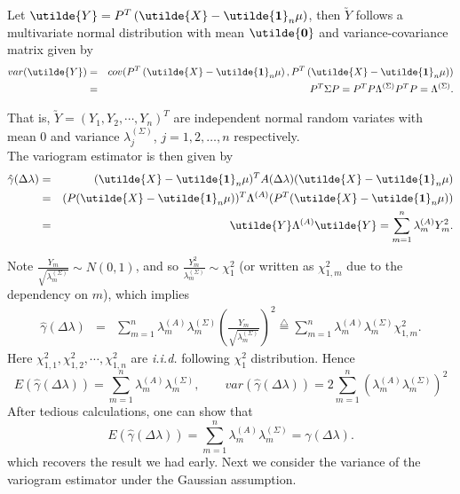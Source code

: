 Let $\utilde{Y} = P^T\left(\utilde{X} - \utilde{\bf 1}_n \mu \right)$, then $\utilde{Y}$ follows a multivariate normal distribution with mean $\utilde{\bf 0}$ and variance-covariance matrix given by
\begin{eqnarray*}
var(\utilde{Y}) &=& cov(P^T\left(\utilde{X} - \utilde{\bf 1}_n \mu \right), P^T\left(\utilde{X} - \utilde{\bf 1}_n \mu \right)) \\
&=& P^T \Sigma P  = P^T P \Lambda^{(\Sigma)} P^T P = \Lambda^{(\Sigma)}.
\end{eqnarray*}

That is, $\utilde{Y} = (Y_1, Y_2, \cdots, Y_n)^T$ are independent normal random variates with mean 0 and variance $\lambda_j^{(\Sigma)}$, $j=1,2,\ldots,n$ respectively. \\

The variogram estimator is then given by
\begin{eqnarray*}
\hat{\gamma}(\Delta \lambda) &=& (\utilde{X}-\utilde{\bf 1}_n\mu)^T A(\Delta \lambda)(\utilde{X}-\utilde{\bf 1}_n\mu) \\
&=& (P(\utilde{X}-\utilde{\bf 1}_n\mu))^T \Lambda^{(A)} (P^T(\utilde{X}-\utilde{\bf 1}_n\mu))  \\
&=& \utilde{Y} \Lambda^{(A)} \utilde{Y} = \sum_{m = 1}^n \lambda_m^{(A)} Y_m^2.
\end{eqnarray*}

Note $\frac{Y_m}{\sqrt{\lambda_m^{(\Sigma)}}} \sim N(0, 1)$, and so $\frac{Y_m^2}{\lambda_m^{(\Sigma)}} \sim \chi_1^2$ (or written as $\chi_{1, m}^2$ due to the dependency on $m$), which implies
\begin{eqnarray*}
\hat{\gamma}(\Delta \lambda) &=& \sum_{m = 1}^n \lambda_m^{(A)} \lambda_m^{(\Sigma)} \left(\frac{Y_m}{\sqrt{\lambda_m^{(\Sigma)}}}\right)^2 \stackrel{\triangle}{=} \sum_{m = 1}^n \lambda_m^{(A)} \lambda_m^{(\Sigma)} \chi_{1,m}^2.
\end{eqnarray*}
Here $\chi_{1, 1}^2, \chi_{1, 2}^2, \cdots, \chi_{1, n}^2$ are {\em i.i.d.} following $\chi_1^2$ distribution. Hence
\[
E(\hat{\gamma}(\Delta \lambda)) = \sum_{m = 1}^n \lambda_m^{(A)} \lambda_m^{(\Sigma)}, \quad \quad var(\hat{\gamma}(\Delta \lambda)) = 2 \sum_{m = 1}^n (\lambda_m^{(A)} \lambda_m^{(\Sigma)})^2
\]
After tedious calculations, one can show that
\[
E(\hat{\gamma}(\Delta \lambda)) = \sum_{m = 1}^n \lambda_m^{(A)} \lambda_m^{(\Sigma)} = \gamma(\Delta \lambda).
\]
which recovers the result we had early. Next we consider the variance of the variogram estimator under the Gaussian assumption. \\

